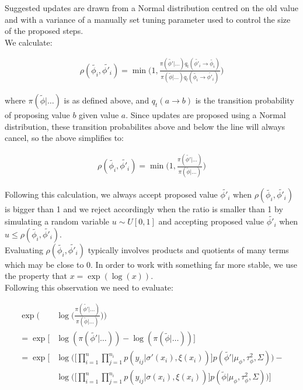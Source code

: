 \documentclass{article}
\begin{document}
Suggested updates are drawn from a Normal distribution centred on the old value and with a variance of a manually set tuning parameter used to control the size of the proposed steps. \\

We calculate:

\begin{align*}
\rho(\tilde{\phi_i}, \tilde{\phi'_i}) = \min \bigg (1, \frac{\pi(\tilde{\phi'} | \dots ) q_t(\tilde{\phi'_i} \to \tilde{\phi_i})}{ \pi(\tilde{\phi} | \dots ) q_t(\tilde{\phi_i} \to \tilde{\phi'_i}) } \bigg)
\end{align*}

where $\pi(\tilde{\phi} | \dots)$ is as defined above, and $q_t(a \to b)$ is the transition probability of proposing value $b$ given value $a$. Since updates are proposed using a Normal distribution, these transition probabilites above and below the line will always cancel, so the above simplifies to:

\begin{align*}
\rho(\tilde{\phi_i}, \tilde{\phi'_i}) = \min \bigg (1, \frac{\pi(\tilde{\phi'} | \dots ) }{ \pi(\tilde{\phi} | \dots ) } \bigg)
\end{align*}

Following this calculation, we always accept proposed value $\tilde{\phi'_i}$ when $\rho(\tilde{\phi_i}, \tilde{\phi'_i})$ is bigger than 1 and we reject accordingly when the ratio is smaller than 1 by simulating a random variable $u \sim U[0, 1]$ and accepting proposed value $\tilde{\phi'_i}$ when $u\leq \rho(\tilde{\phi_i}, \tilde{\phi'_i})$. \\

Evaluating $\rho(\tilde{\phi_i}, \tilde{\phi'_i})$ typically involves products and quotients of many terms which may be close to 0. In order to work with something far more stable, we use the property that $x = \exp(\log(x))$. \\ 

Following this observation we need to evaluate:

\begin{align*}
\exp \bigg( & \log \bigg (\frac{\pi(\tilde{\phi'} | \dots ) }{ \pi(\tilde{\phi} | \dots ) } \bigg) \bigg) \\
= \exp \big[ & \log(\pi(\tilde{\phi'} | \dots )) - \log(\pi(\tilde{\phi} | \dots )) \big] \\
= \exp \Big[ & \log \Big( \Big[ \prod_{i=1}^n \prod_{j=1}^{n_i} p(y_{ij} | \sigma'(x_i), \xi(x_i)) \Big] p(\tilde{\phi'} | \mu_\phi, \tau^2_\phi, \Sigma) \Big) - \\
& \log \Big( \Big[ \prod_{i=1}^n \prod_{j=1}^{n_i} p(y_{ij} | \sigma(x_i), \xi(x_i)) \Big] p(\tilde{\phi} | \mu_\phi, \tau^2_\phi, \Sigma) \Big) \Big]
\end{align*}
\end{document}
